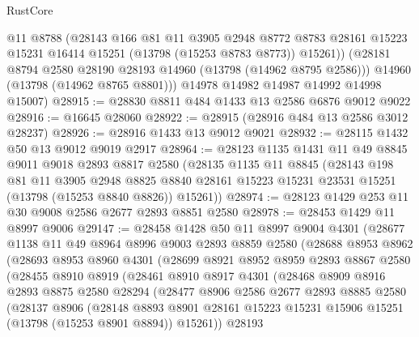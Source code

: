 \begin{lexlean}{RustCore}
\begin{coremodule}
          @11
          @8788
          (@28143
            @166
            @81
            @11
            @3905
            @2948
            @8772
            @8783
            @28161
            @15223
            @15231
            @16414
            @15251
            (@13798 (@15253 @8783 @8773))
            @15261))
        (@28181 @8794 @2580 @28190 @28193 @14960 (@13798 (@14962 @8795 @2586)))
        @14960
        (@13798 (@14962 @8765 @8801)))
      @14978
      @14982
      @14987
      @14992
      @14998
      @15007)
@28915 := @28830 @8811 @484 @1433 @13 @2586 @6876 @9012 @9022
@28916 := @16645 @28060
@28922 := @28915 (@28916 @484 @13 @2586 @3012 @28237)
@28926 := @28916 @1433 @13 @9012 @9021
@28932 := @28115 @1432 @50 @13 @9012 @9019 @2917
@28964 := @28123
    @1135
    @1431
    @11
    @49
    @8845
    @9011
    @9018
    @2893
    @8817
    @2580
    (@28135
      @1135
      @11
      @8845
      (@28143
        @198
        @81
        @11
        @3905
        @2948
        @8825
        @8840
        @28161
        @15223
        @15231
        @23531
        @15251
        (@13798 (@15253 @8840 @8826))
        @15261))
@28974 := @28123 @1429 @253 @11 @30 @9008 @2586 @2677 @2893 @8851 @2580
@28978 := @28453 @1429 @11 @8997 @9006
@29147 := @28458
    @1428
    @50
    @11
    @8997
    @9004
    @4301
    (@28677
      @1138
      @11
      @49
      @8964
      @8996
      @9003
      @2893
      @8859
      @2580
      (@28688
        @8953
        @8962
        (@28693
          @8953
          @8960
          @4301
          (@28699
            @8921
            @8952
            @8959
            @2893
            @8867
            @2580
            (@28455
              @8910
              @8919
              (@28461
                @8910
                @8917
                @4301
                (@28468
                  @8909
                  @8916
                  @2893
                  @8875
                  @2580
                  @28294
                  (@28477
                    @8906
                    @2586
                    @2677
                    @2893
                    @8885
                    @2580
                    (@28137
                      @8906
                      (@28148
                        @8893
                        @8901
                        @28161
                        @15223
                        @15231
                        @15906
                        @15251
                        (@13798 (@15253 @8901 @8894))
                        @15261))
                    @28193

\end{coremodule}
\end{lexlean}
